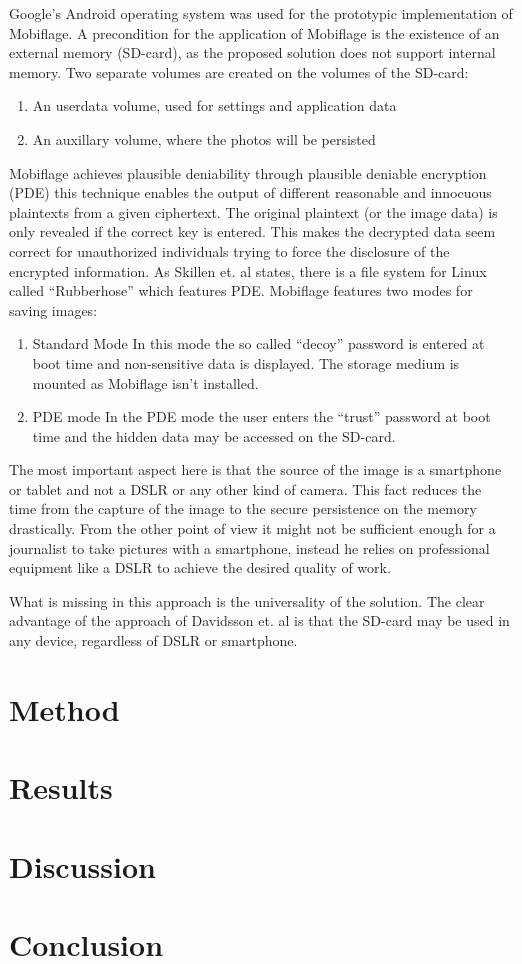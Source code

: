 \documentclass[12pt,a4paper,titlepage,oneside]{scrartcl}
\begin{document}
Google's Android operating system was used for the prototypic implementation of Mobiflage.
A precondition for the application of Mobiflage is the existence of an external memory (SD-card), as the proposed solution does not support internal memory.
Two separate volumes are created on the volumes of the SD-card:
\begin{enumerate}
  \item An userdata volume, used for settings and application data
  \item An auxillary volume, where the photos will be persisted
\end{enumerate}

Mobiflage achieves plausible deniability through plausible deniable encryption (PDE) this technique enables the output of different reasonable and innocuous plaintexts from a given ciphertext.
The original plaintext (or the image data) is only revealed if the correct key is entered.
This makes the decrypted data seem correct for unauthorized individuals trying to force the disclosure of the encrypted information.
As Skillen et. al states, there is a file system for Linux called ``Rubberhose'' which features PDE.
Mobiflage features two modes for saving images: 
\begin{enumerate}
  \item Standard Mode
  In this mode the so called ``decoy'' password is entered at boot time and non-sensitive data is displayed.
  The storage medium is mounted as Mobiflage isn't installed.
  \item PDE mode
  In the PDE mode the user enters the ``trust'' password at boot time and the hidden data may be accessed on the SD-card.
\end{enumerate}

The most important aspect here is that the source of the image is a smartphone or tablet and not a DSLR or any other kind of camera.
This fact reduces the time from the capture of the image to the secure persistence on the memory drastically.
From the other point of view it might not be sufficient enough for a journalist to take pictures with a smartphone, instead he relies on professional equipment like a DSLR to achieve the desired quality of work.

What is missing in this approach is the universality of the solution.
The clear advantage of the approach of Davidsson et. al \cite{Davidsson2016} is that the SD-card may be used in any device, regardless of DSLR or smartphone.

\newpage
\section{Method}
\newpage
\section{Results}
\newpage
\section{Discussion}
\newpage
\section{Conclusion}
\newpage




\end{document}
